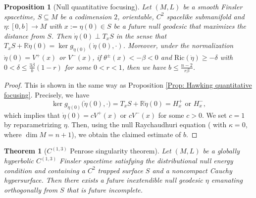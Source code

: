 \documentclass[a4paper,11pt]{article}
\numberwithin{equation}{section}
\theoremstyle{definition}
\theoremstyle{plain}
\newtheorem{Theorem}[Definition]{Theorem}
\newtheorem{Proposition}[Definition]{Proposition}
\newcommand{\R}{\mathbb R}
\newcommand{\Ric}{\mathrm{Ric}}
\begin{document}
\begin{Proposition}[Null quantitative focusing]
\label{Prop: Null quantitative focusing}
Let $(M,L)$ be a smooth Finsler spacetime, $S \subseteq M$ be a codimension $2$, orientable, $C^2$ spacelike submanifold and $\eta:[0,b] \to M$ with $x:=\eta(0) \in S$ be a future null geodesic that maximizes the distance from $S$. 
Then $\dot{\eta}(0) \perp T_xS$ in the sense that $T_xS + \R \dot{\eta}(0)= \ker g_{\dot{\eta}(0)}(\dot{\eta}(0),\cdot)$.
Moreover, under the normalization $\dot{\eta}(0)=V^+(x)$ or $V^-(x)$, if $\theta^\pm(x) < - \beta<0$ and $\Ric(\dot \eta) \geq - \delta$ with $0 < \delta \leq \frac{3 \beta}{b}(1-r)$ for some $0 < r < 1$, then we have $b \leq \frac{n-2}{r\beta}$.
\end{Proposition}

\begin{proof}
This is shown in the same way as Proposition \ref{Prop: Hawking quantitative focusing}.
Precisely, we have
\[
\ker g_{\dot{\eta}(0)}\bigl(\dot{\eta}(0),\cdot\bigr)
=T_xS + \R \dot{\eta}(0)
=H^+_x \text{ or } H^-_x,
\]
which implies that $\dot{\eta}(0)=cV^+(x)$ or $cV^-(x)$ for some $c>0$.
We set $c=1$ by reparametrizing $\eta$.
Then, using the null Raychaudhuri equation (\cite[Eq.\ (31)]{MinguzziRaychaudhuri} with $\kappa=0$, where $\dim M=n+1$), we obtain the claimed estimate of $b$.
\end{proof}

\begin{Theorem}[$C^{(1,3)}$ Penrose singularity theorem]
\label{theorem: unweighted penrose}
Let $(M,L)$ be a globally hyperbolic $C^{(1,3)}$ Finsler spacetime satisfying the distributional null energy condition and containing a $C^2$ trapped surface $S$ and a noncompact Cauchy hypersurface. 
Then there exists a future inextendible null geodesic $\eta$ emanating orthogonally from $S$ that is future incomplete.
\end{Theorem}
\end{document}
